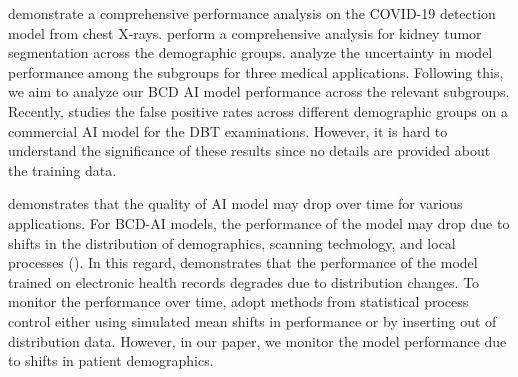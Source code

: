 \cite{sun2022performance} demonstrate a comprehensive performance analysis on the COVID-19 detection model from chest X-rays. \cite{afzal2023towards} perform a comprehensive analysis for kidney tumor segmentation across the demographic groups. \cite{mehta2024evaluating} analyze the uncertainty in model performance among the subgroups for three medical applications. Following this, we aim to analyze our BCD AI model performance across the relevant subgroups. Recently, \cite{nguyen2024patient} studies the false positive rates across different demographic groups on a commercial AI model for the DBT examinations. However, it is hard to understand the significance of these results since no details are provided about the training data.

\cite{vela2022temporal} demonstrates that the quality of AI model may drop over time for various applications. For BCD-AI models, the performance of the model may drop due to shifts in the distribution of demographics, scanning technology, and local processes (\cite{sahiner2023data}). In this regard, \cite{nestor2019feature} demonstrates that the performance of the model trained on electronic health records degrades due to distribution changes. To monitor the performance over time, \cite{prathapan2024quantifying, zamzmi2024out} adopt methods from statistical process control either using simulated mean shifts in performance or by inserting out of distribution data. However, in our paper, we monitor the model performance due to shifts in patient demographics.